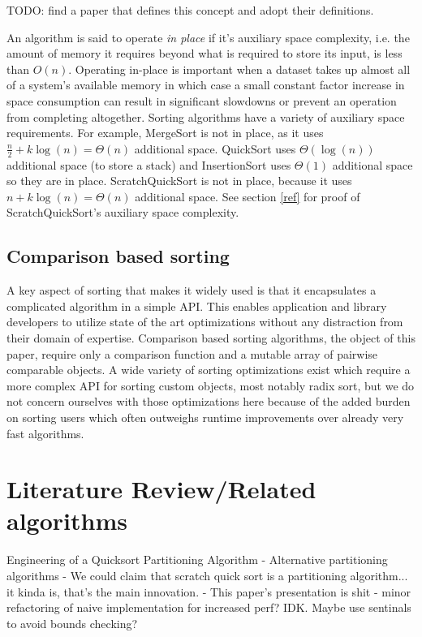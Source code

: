 \documentclass{juliacon}
\begin{document}
TODO: find a paper that defines this concept and adopt their definitions.

An algorithm is said to operate \textit{in place} if it's auxiliary space complexity, i.e. the amount of memory it requires beyond what is required to store its input, is less than $O(n)$. Operating in-place is important when a dataset takes up almost all of a system's available memory in which case a small constant factor increase in space consumption can result in significant slowdowns or prevent an operation from completing altogether. Sorting algorithms have a variety of auxiliary space requirements. For example, MergeSort is not in place, as it uses $\frac{n}{2} + k\log(n) = \Theta(n)$ additional space. QuickSort uses $\Theta(\log(n))$ additional space (to store a stack) and InsertionSort uses $\Theta(1)$ additional space so they are in place. ScratchQuickSort is not in place, because it uses $n + k\log(n) = \Theta(n)$ additional space. See section \ref{ref} for proof of ScratchQuickSort's auxiliary space complexity.

\subsection{Comparison based sorting}

A key aspect of sorting that makes it widely used is that it encapsulates a complicated algorithm in a simple API. This enables application and library developers to utilize state of the art optimizations without any distraction from their domain of expertise. Comparison based sorting algorithms, the object of this paper, require only a comparison function and a mutable array of pairwise comparable objects. A wide variety of sorting optimizations exist which require a more complex API for sorting custom objects, most notably radix sort, but we do not concern ourselves with those optimizations here because of the added burden on sorting users which often outweighs runtime improvements over already very fast algorithms.

\section{Literature Review/Related algorithms}

Engineering of a Quicksort Partitioning Algorithm
  - Alternative partitioning algorithms
  - We could claim that scratch quick sort is a partitioning algorithm... it kinda is, that's the main innovation.
  - This paper's presentation is shit
  - minor refactoring of naive implementation for increased perf? IDK. Maybe use sentinals to avoid bounds checking?
\end{document}

